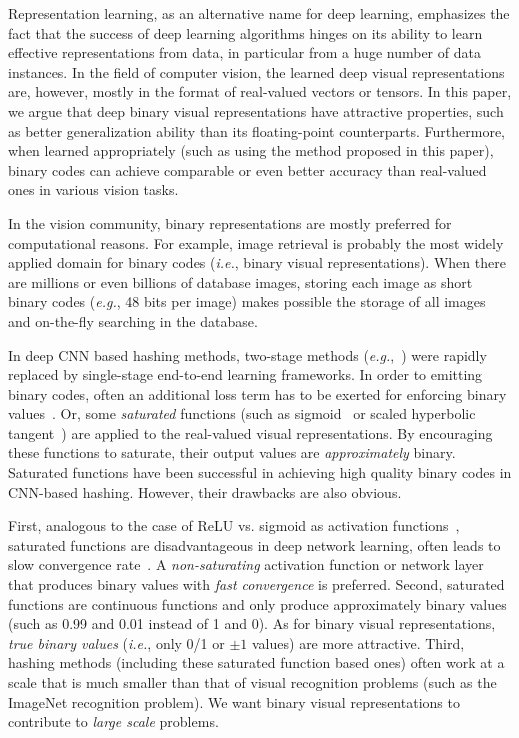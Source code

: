 \documentclass[runningheads]{llncs}
\begin{document}
Representation learning, as an alternative name for deep learning, emphasizes the fact that the success of deep learning algorithms hinges on its ability to learn effective representations from data, in particular from a huge number of data instances. In the field of computer vision, the learned deep visual representations are, however, mostly in the format of real-valued vectors or tensors. In this paper, we argue that deep binary visual representations have attractive properties, such as better generalization ability than its floating-point counterparts. Furthermore, when learned appropriately (such as using the method proposed in this paper), binary codes can achieve comparable or even better accuracy than real-valued ones in various vision tasks.

In the vision community, binary representations are mostly preferred for computational reasons. For example, image retrieval is probably the most widely applied domain for binary codes (\emph{i.e.}, binary visual representations). When there are millions or even billions of database images, storing each image as short binary codes (\emph{e.g.}, 48 bits per image) makes possible the storage of all images and on-the-fly searching in the database.

In deep CNN based hashing methods, two-stage methods (\emph{e.g.},~\cite{Xia14AAAI_r11}) were rapidly replaced by single-stage end-to-end learning frameworks. In order to emitting binary codes, often an additional loss term has to be exerted for enforcing binary values~\cite{Liu16CVPR_r12}. Or, some \emph{saturated} functions (such as sigmoid~\cite{Lin15CVPRW_r13} or scaled hyperbolic tangent~\cite{Li17ACMMM_r14,Cao17ICCV_r15}) are applied to the real-valued visual representations. By encouraging these functions to saturate, their output values are \emph{approximately} binary. Saturated functions have been successful in achieving high quality binary codes in CNN-based hashing. However, their drawbacks are also obvious.

First, analogous to the case of ReLU vs. sigmoid as activation functions~\cite{ReLU}, saturated functions are disadvantageous in deep network learning, often leads to slow convergence rate~\cite{Liu16CVPR_r12}. A \emph{non-saturating} activation function or network layer that produces binary values with \emph{fast convergence} is preferred. Second, saturated functions are continuous functions and only produce approximately binary values (such as 0.99 and 0.01 instead of 1 and 0). As for binary visual representations, \emph{true binary values} (\emph{i.e.}, only 0/1 or $\pm 1$ values) are more attractive. Third, hashing methods (including these saturated function based ones) often work at a scale that is much smaller than that of visual recognition problems (such as the ImageNet recognition problem). We want binary visual representations to contribute to \emph{large scale} problems.
\end{document}
